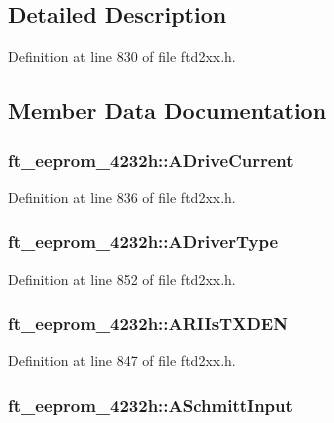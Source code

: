 \subsection{Detailed Description}


Definition at line 830 of file ftd2xx.h.

\subsection{Member Data Documentation}
\hypertarget{structft__eeprom__4232h_a67ec1ef6e8b91116d539dd304c9c6f53}{
\subsubsection[{ADriveCurrent}]{ {\bf ft\_\-eeprom\_\-4232h::ADriveCurrent}}}
\label{structft__eeprom__4232h_a67ec1ef6e8b91116d539dd304c9c6f53}


Definition at line 836 of file ftd2xx.h.\hypertarget{structft__eeprom__4232h_a6a17d8b26142bd25157ea275e8034f11}{
\subsubsection[{ADriverType}]{ {\bf ft\_\-eeprom\_\-4232h::ADriverType}}}
\label{structft__eeprom__4232h_a6a17d8b26142bd25157ea275e8034f11}


Definition at line 852 of file ftd2xx.h.\hypertarget{structft__eeprom__4232h_aa9c900ec8d69e1a792a4b9bac1b4eeb9}{
\subsubsection[{ARIIsTXDEN}]{ {\bf ft\_\-eeprom\_\-4232h::ARIIsTXDEN}}}
\label{structft__eeprom__4232h_aa9c900ec8d69e1a792a4b9bac1b4eeb9}


Definition at line 847 of file ftd2xx.h.\hypertarget{structft__eeprom__4232h_a47fdc0898935fa1d2c60cfcf93685231}{
\subsubsection[{ASchmittInput}]{ {\bf ft\_\-eeprom\_\-4232h::ASchmittInput}}}
\label{structft__eeprom__4232h_a47fdc0898935fa1d2c60cfcf93685231}


